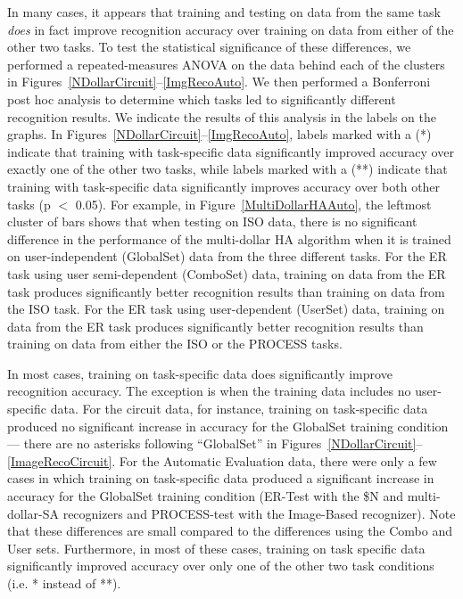 \documentclass[final,5p,twocolumn]{elsarticle}
\providecommand{\note}[1]{\textcolor{red}{\textbf{ #1 }}}
\begin{document}
In many cases, it appears that
training and testing on data from the same task \emph{does} in fact improve
recognition accuracy over training on data from either of the other two tasks.
To test the statistical significance of these differences, we performed a repeated-measures
ANOVA on the data behind each of the clusters in Figures~\ref{NDollarCircuit}--\ref{ImgRecoAuto}.
We then performed a Bonferroni post hoc analysis to determine
which tasks led to significantly different recognition results.
We indicate the results of this analysis in the labels on the graphs.  
In Figures~\ref{NDollarCircuit}--\ref{ImgRecoAuto},
labels marked with a (*) indicate that training with task-specific data significantly
improved accuracy over exactly one of the other two tasks, while labels
marked with a (**) indicate that training with task-specific data significantly
improves accuracy over both other tasks (p $<$ 0.05).  For example, in Figure~\ref{MultiDollarHAAuto},
the leftmost cluster of bars shows that 
when testing on ISO data, there is no significant difference in the performance 
of the multi-dollar HA algorithm when it is trained on user-independent (GlobalSet)
data from the three different tasks.  For the ER task using user semi-dependent (ComboSet) data, 
training on data from the ER task produces significantly better recognition results than
training on data from the ISO task.  For the ER task using user-dependent (UserSet) data,
training on data from the ER task produces significantly better recognition results
than training on data from either the ISO or the PROCESS tasks. 


In most cases, training on task-specific data does
significantly improve recognition accuracy. The exception is when the
training data includes no user-specific data. For the circuit data,
for instance, training on task-specific data produced no significant
increase in accuracy for the GlobalSet training condition --- there
are no asterisks following ``GlobalSet'' in
Figures~\ref{NDollarCircuit}--\ref{ImageRecoCircuit}.  For the
Automatic Evaluation data, there were only a few cases in which
training on task-specific data produced a significant increase in
accuracy for the GlobalSet training condition (ER-Test with the \$N
and multi-dollar-SA recognizers and PROCESS-test with the Image-Based
recognizer). Note that these differences are small compared to
the differences using the Combo and User sets.  Furthermore,
in most of these cases, training on task specific data significantly
improved accuracy over only one of the other two task conditions (i.e. *
instead of **). 
\end{document}
